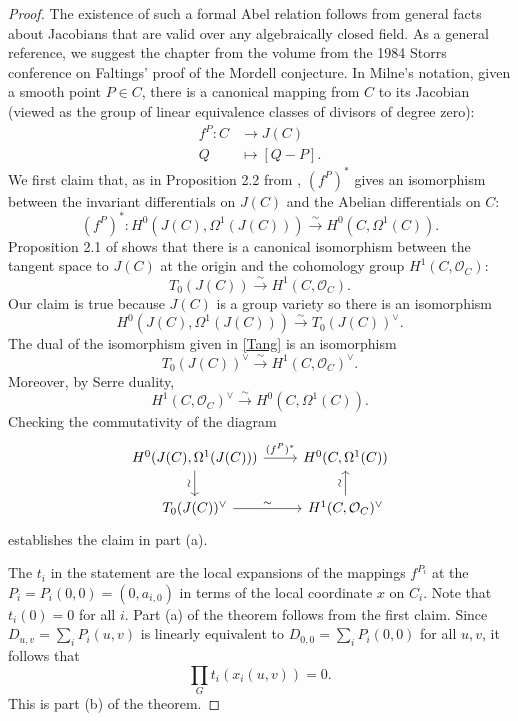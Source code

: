 \documentclass[12pt]{amsart}
\theoremstyle{theorem}
\begin{document}
\begin{proof}
The existence of such a formal Abel relation follows from general facts about Jacobians that are valid over
any algebraically closed field.  As a general reference, we suggest the chapter \cite{Milne} from the 
volume from the 1984 Storrs  conference on Faltings' proof of the Mordell conjecture.  In Milne's notation, 
given a smooth point $P \in C$, there is a canonical mapping from $C$ to its Jacobian (viewed as the group
of linear equivalence classes of divisors of degree zero):
\begin{align*}
f^P : C &\longrightarrow J(C)\\
Q &\mapsto [Q - P].
\end{align*} 
We first claim that, as in Proposition 2.2 from \cite{Milne},  $(f^P)^*$ gives an isomorphism between the invariant differentials 
on $J(C)$ and the Abelian differentials on $C$:
$$(f^P)^* : H^0(J(C), \Omega^1(J(C))) \stackrel{\sim}{\longrightarrow} H^0(C, \Omega^1(C)).$$
Proposition 2.1 of \cite{Milne} shows that there is a canonical isomorphism
between the tangent space to $J(C)$ at the origin and the cohomology
group $H^1(C,\mathcal{O}_C)$:
\begin{equation}
\label{Tang}
T_0(J(C))  \stackrel{\sim}{\longrightarrow} H^1(C, \mathcal{O}_C).
\end{equation}
Our claim is true because $J(C)$ is a group variety so there 
is an isomorphism 
$$H^0(J(C), \Omega^1(J(C))) \stackrel{\sim}{\longrightarrow} T_0(J(C))^\vee.$$ 
The dual of the isomorphism given in \eqref{Tang} is an isomorphism
$$T_0(J(C))^\vee \stackrel{\sim}{\longrightarrow} H^1(C,\mathcal{O}_C)^\vee.$$
Moreover, by Serre duality, 
$$H^1(C, \mathcal{O}_C)^\vee \stackrel{\sim}{\longrightarrow} H^0(C,\Omega^1(C)).$$
Checking the commutativity of the diagram
$$
\begin{tikzcd}
H^0(J(C), \Omega^1(J(C)))  \arrow[r, "(f^P)^*"]  \arrow[d,"\sim" {anchor=south, rotate=90}] & H^0(C,\Omega^1(C)) \\
T_0(J(C))^\vee \arrow[r,"\sim"] & H^1(C,\mathcal{O}_C)^\vee  \arrow[u, "\sim" {anchor=south,rotate=90}]
\end{tikzcd}
$$       
establishes the claim in part (a). 

The $t_i$ in the statement are the local expansions of the mappings $f^{P_i}$ at the $P_i = P_i(0,0) = (0,a_{i,0})$ in 
terms of the local coordinate $x$ on $C_i$.  Note that $t_i(0) = 0$ for all $i$.   Part (a) of the theorem follows from the first claim.
Since $D_{u,v} = \sum_i P_i(u,v)$ is linearly equivalent to $D_{0,0} = \sum_i P_i(0,0)$
for all $u,v$, it follows that 
$$\prod_G  t_i (x_i(u,v)) = 0.$$
This is part (b) of the theorem.
\end{proof}
\end{document}
